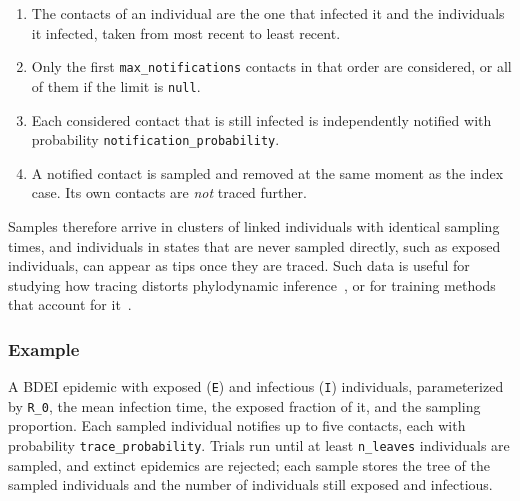 \documentclass[11pt]{article}
\begin{document}
\begin{enumerate}
  \item The contacts of an individual are the one that infected it and the
        individuals it infected, taken from most recent to least recent.
  \item Only the first \texttt{max\_notifications} contacts in that order are
        considered, or all of them if the limit is \texttt{null}.
  \item Each considered contact that is still infected is independently notified
        with probability \texttt{notification\_probability}.
  \item A notified contact is sampled and removed at the same moment as the
        index case. Its own contacts are \emph{not} traced further.
\end{enumerate}

Samples therefore arrive in clusters of linked individuals with identical
sampling times, and individuals in states that are never sampled directly, such
as exposed individuals, can appear as tips once they are traced. Such data is
useful for studying how tracing distorts phylodynamic
inference~\citep{zhukova2025contact}, or for training methods that account for
it~\citep{xie2024contact}.

\subsubsection*{Example}

A BDEI epidemic with exposed (\texttt{E}) and infectious (\texttt{I})
individuals, parameterized by \texttt{R\_0}, the mean infection time, the
exposed fraction of it, and the sampling proportion. Each sampled individual
notifies up to five contacts, each with probability \texttt{trace\_probability}.
Trials run until at least \texttt{n\_leaves} individuals are sampled, and
extinct epidemics are rejected; each sample stores the tree of the sampled
individuals and the number of individuals still exposed and infectious.
\end{document}
